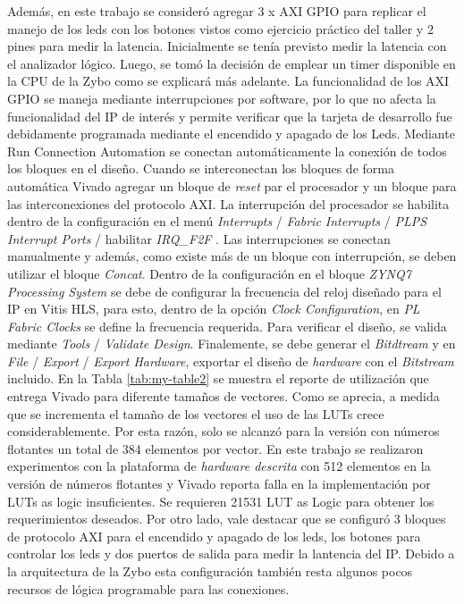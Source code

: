 \documentclass[conference]{IEEEtran}
\begin{document}
 Además, en este trabajo se consideró agregar 3 x AXI GPIO para replicar el manejo de los leds con los botones vistos como ejercicio práctico del taller y 2 pines para medir la latencia. Inicialmente se tenía previsto medir la latencia con el analizador lógico. Luego, se tomó la decisión  de emplear un timer  disponible en la CPU de la Zybo como se explicará más adelante.  La funcionalidad de los AXI GPIO se maneja mediante interrupciones por software, por lo que no afecta la funcionalidad del IP de interés  y permite verificar que la tarjeta de desarrollo fue debidamente programada mediante el encendido y apagado de los Leds. Mediante Run Connection Automation se conectan automáticamente la conexión de todos los bloques en el diseño. Cuando se interconectan los bloques de forma automática Vivado agregar un bloque de \textit{reset} par el procesador y un bloque para las interconexiones del protocolo AXI. La interrupción del procesador se habilita dentro de la configuración en el  menú \textit{Interrupts} / \textit{Fabric Interrupts} / \textit{PL\-PS Interrupt Ports}  / habilitar \textit{IRQ\_F2F} .  Las  interrupciones  se conectan manualmente y además, como existe más de un bloque con interrupción,  se deben  utilizar el bloque \textit{Concat}. Dentro de la configuración en el bloque \textit{ZYNQ7 Processing System} se debe de configurar la frecuencia del reloj diseñado para el IP en Vitis HLS, para esto, dentro de la opción \textit{Clock Configuration}, en \textit{PL Fabric Clocks} se define la frecuencia requerida. Para verificar el diseño, se valida mediante \textit{Tools} /  \textit{Validate Design}. Finalemente, se debe generar el \textit{Bitdtream} y en  \textit{File} / \textit{Export} / \textit{Export Hardware},  exportar el diseño de \textit{hardware} con el \textit{Bitstream} incluido. En la Tabla \ref{tab:my-table2} se muestra el reporte de utilización que entrega Vivado para diferente tamaños de vectores. Como se aprecia, a medida que se incrementa el tamaño de los vectores el uso de las LUTs crece considerablemente. Por esta razón, solo se alcanzó para  la versión con números flotantes un total de 384 elementos por vector. En este trabajo se realizaron experimentos con la plataforma de \textit{hardware descrita} con 512 elementos en la versión de números flotantes y Vivado reporta falla en la implementación por LUTs as logic insuficientes. Se requieren 21531 LUT as Logic para obtener los requerimientos deseados. Por otro lado, vale destacar que se configuró 3 bloques de protocolo AXI para el encendido y apagado de los leds, los botones para controlar los leds y dos puertos de salida para medir la lantencia del IP. Debido a la  arquitectura de la Zybo esta configuración también  resta algunos pocos recursos de lógica programable para las conexiones. 
\end{document}
